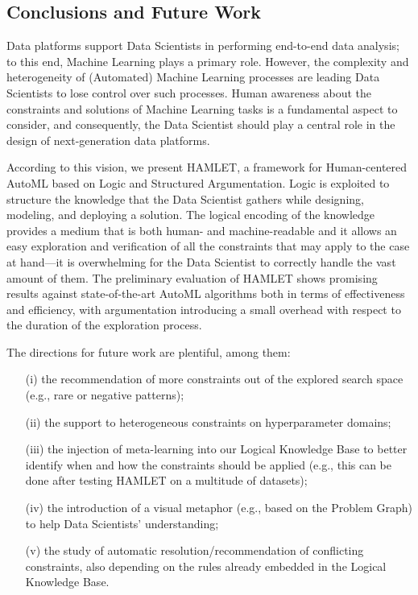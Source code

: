 \subsection{Conclusions and Future Work}\label{ssec:conclusion}

Data platforms support Data Scientists in performing end-to-end data analysis; to this end, Machine Learning plays a primary role.
However, the complexity and heterogeneity of (Automated) Machine Learning processes are leading Data Scientists to lose control over such processes.
Human awareness about the constraints and solutions of Machine Learning tasks is a fundamental aspect to consider, and consequently, the Data Scientist should play a central role in the design of next-generation data platforms.

According to this vision, we present HAMLET, a framework for Human-centered AutoML based on Logic and Structured Argumentation.
Logic is exploited to structure the knowledge that the Data Scientist gathers while designing, modeling, and deploying a solution.
The logical encoding of the knowledge provides a medium that is both human- and machine-readable and it allows an easy exploration and verification of all the constraints that may apply to the case at hand---it is overwhelming for the Data Scientist to correctly handle the vast amount of them.
The preliminary evaluation of HAMLET shows promising results against state-of-the-art AutoML algorithms both in terms of effectiveness and efficiency, with argumentation introducing a small overhead with respect to the duration of the exploration process.

The directions for future work are plentiful, among them:
\begin{itemize}
    \item[(i)] the recommendation of more constraints out of the explored search space (e.g., rare or negative patterns);
    \item[(ii)] the support to heterogeneous constraints on hyperparameter domains;
    \item[(iii)] the injection of meta-learning into our Logical Knowledge Base to better identify when and how the constraints should be applied (e.g., this can be done after testing HAMLET on a multitude of datasets);
    \item[(iv)] the introduction of a visual metaphor (e.g., based on the Problem Graph) to help Data Scientists' understanding;
    \item[(v)] the study of automatic resolution/recommendation of conflicting constraints, also depending on the rules already embedded in the Logical Knowledge Base.
\end{itemize}
